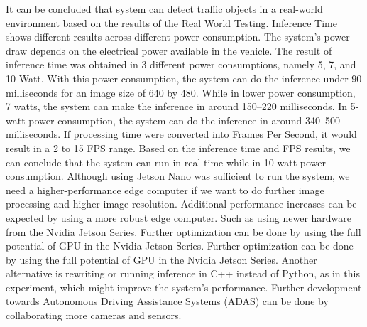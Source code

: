 \documentclass[conference]{IEEEtran}
\begin{document}
It can be concluded that system can detect traffic objects in a real-world environment based on the results of the Real World Testing. Inference Time shows different results across different power consumption.
The system's power draw depends on the electrical power available in the vehicle. The result of inference time was obtained in 3 different power consumptions, namely 5, 7, and 10 Watt. With this power consumption, the system can do the inference under
90 milliseconds for an image size of 640 by 480. While in lower power consumption, 7 watts, the system can make the inference in around 150–220 milliseconds.
In 5-watt power consumption, the system can do the inference in around 340–500 milliseconds. If processing time were converted into Frames Per Second, it would result in a 2 to 15 FPS range. Based on the inference time and FPS results, we can conclude that the system can run in real-time while in 10-watt power consumption.
Although using Jetson Nano was sufficient to run the system, we need a higher-performance edge computer if we want to do further image processing and higher image resolution. Additional performance increases can be expected by using a more robust edge computer. Such as using newer hardware from the Nvidia Jetson Series. Further optimization can be done by using the full potential of GPU in the Nvidia Jetson Series.
Further optimization can be done by using the full potential of GPU in the Nvidia Jetson Series. Another alternative is rewriting or running inference in C++ instead of Python, as in this experiment, which might improve the system's performance.
Further development towards Autonomous Driving Assistance Systems (ADAS) can be done by collaborating more cameras and sensors.



\end{document}

